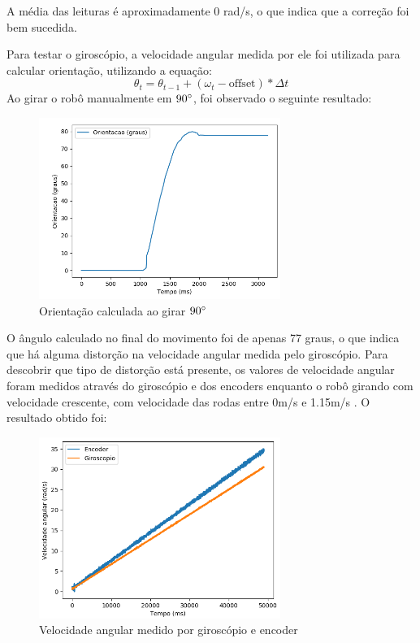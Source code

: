 \documentclass[
	12pt,				%
	openright,			%
	twoside,			%
	convert,
	a4paper,			%
	english,			%
	french,				%
	spanish,			%
	brazil				%
	]{abntex2}
\begin{document}
A média das leituras é aproximadamente 0 rad/s, o que indica que a correção foi bem sucedida. 
\par
Para testar o giroscópio, a velocidade angular medida por ele foi utilizada para calcular orientação, utilizando a equação:
\begin{equation}
	\theta_t = \theta_{t-1} + (\omega_t - \mathrm{offset}) * \Delta t
\end{equation}
Ao girar o robô manualmente em $90\degree$, foi observado o seguinte resultado:
\begin{figure}[H]
	\caption{Orientação calculada ao girar $90\degree$}
\begin{center}
   \includegraphics[width=0.7\textwidth]{gyro_90_graus}
\end{center}
\end{figure}
O ângulo calculado no final do movimento foi de apenas 77 graus, o que indica que há alguma distorção na velocidade angular medida pelo giroscópio. Para descobrir que tipo de distorção está presente, os valores de velocidade angular foram medidos através do giroscópio e dos encoders enquanto o robô girando com velocidade crescente, com velocidade das rodas entre 0m/s e 1.15m/s . O resultado obtido foi:
\begin{figure}[H]
	\caption{Velocidade angular medido por giroscópio e encoder}
\begin{center}
   \includegraphics[width=0.7\textwidth]{gyro_enc_comparacao}
\end{center}
\end{figure}
\end{document}
